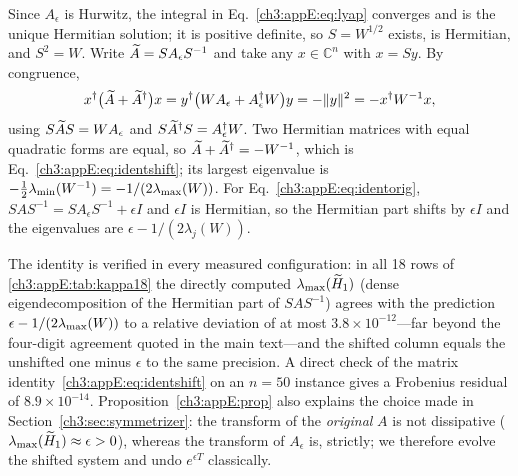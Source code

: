 \begin{lemproof}
Since $A_\epsilon$ is Hurwitz, the integral in
Eq.~\eqref{ch3:appE:eq:lyap} converges and is the unique Hermitian
solution; it is positive definite, so $S=W^{1/2}$ exists, is
Hermitian, and $S^{2}=W$.  Write
$\widetilde{A}=SA_\epsilon S^{-1}$ and take any $x\in\mathbb{C}^{n}$ with
$x=Sy$.  By congruence,
\begin{equation}
  x^{\dagger}\bigl(\At+\At^{\dagger}\bigr)x
  = y^{\dagger}\bigl(WA_\epsilon+A_\epsilon^{\dagger}W\bigr)y
  = -\lVert y\rVert^{2}
  = -x^{\dagger}W^{-1}x,
  \label{ch3:appE:eq:congruence}
\end{equation}
using $S\widetilde{A} S = WA_\epsilon$ and $S\widetilde{A}^{\dagger}S =
A_\epsilon^{\dagger}W$.  Two Hermitian matrices with equal quadratic
forms are equal, so $\widetilde{A}+\widetilde{A}^{\dagger}=-W^{-1}$, which is
Eq.~\eqref{ch3:appE:eq:identshift}; its largest eigenvalue is
$-\tfrac12\lambda_{\min}(W^{-1})=-1/(2\lambda_{\max}(W))$.  For
Eq.~\eqref{ch3:appE:eq:identorig}, $SAS^{-1}=SA_\epsilon
S^{-1}+\epsilon I$ and $\epsilon I$ is Hermitian, so the Hermitian
part shifts by $\epsilon I$ and the eigenvalues are
$\epsilon-1/(2\lambda_j(W))$.
\end{lemproof}

The identity is verified in every measured configuration: in all 18
rows of \ref{ch3:appE:tab:kappa18} the directly computed
$\lambda_{\max}(\widetilde{H}_1)$ (dense eigendecomposition of the Hermitian part of
$SAS^{-1}$) agrees with the prediction $\epsilon-1/(2\lambda_{\max}(W))$ to a
relative deviation of at most $3.8\times10^{-12}$---far beyond the
four-digit agreement quoted in the main text---and the shifted column
equals the unshifted one minus $\epsilon$ to the same precision.  A
direct check of the matrix identity~\eqref{ch3:appE:eq:identshift} on an
$n=50$ instance gives a Frobenius residual of $8.9\times10^{-14}$.
Proposition~\ref{ch3:appE:prop} also explains the choice made in
Section~\ref{ch3:sec:symmetrizer}: the transform of the \emph{original} $A$
is not dissipative ($\lambda_{\max}(\widetilde{H}_1)\approx\epsilon>0$), whereas the
transform of $A_\epsilon$ is, strictly; we therefore evolve the
shifted system and undo $e^{\epsilon T}$ classically.

